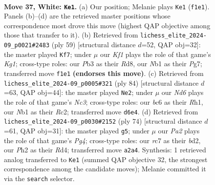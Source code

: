 \documentclass[11pt]{article}
\begin{document}
\clearpage

\begin{figure}[p]\centering
\begin{subfigure}{0.46\textwidth}\centering
\resizebox{\linewidth}{!}{%
\newchessgame
\chessboard[
  setfen={6k1/2r2ppp/rnbN4/p3p1P1/8/1P2P1R1/P5PP/RN3K2 w - - 2 37},
  showmover=false,
  pgfstyle=straightmove, color=movearrow, markmove={f1-e1}
]}
\caption{}
\end{subfigure}\hfill
\begin{subfigure}{0.46\textwidth}\centering
\resizebox{\linewidth}{!}{%
\newchessgame
\chessboard[
  setfen={3r2k1/1pr3pp/8/pP6/Pn1p1PP1/3P4/1B3R1P/3R2K1 b - - 0 30},
  showmover=false,
  pgfstyle=straightmove, color=movearrow, markmove={g8-f7}
]}
\caption{}
\end{subfigure}
\\[4pt]
\begin{subfigure}{0.46\textwidth}\centering
\resizebox{\linewidth}{!}{%
\newchessgame
\chessboard[
  setfen={1r3b2/r4pk1/2p5/3p4/p2P1PB1/1nN3P1/1PR2PK1/7R w - - 12 43},
  showmover=false,
  pgfstyle=straightmove, color=movearrow, markmove={c3-e2}
]}
\caption{}
\end{subfigure}\hfill
\begin{subfigure}{0.46\textwidth}\centering
\resizebox{\linewidth}{!}{%
\newchessgame
\chessboard[
  setfen={8/3r1kpp/R2p1p2/1p1N1P2/3RP1PP/3P4/1r1b4/7K w - - 1 38},
  showmover=false,
  pgfstyle=straightmove, color=movearrow, markmove={g4-g5}
]}
\caption{}
\end{subfigure}
\caption{\textbf{Move 37, White: \texttt{Ke1}.} (a) Our position; Melanie plays \texttt{Ke1} (\texttt{f1e1}). Panels (b)--(d) are the retrieved master positions whose correspondence most drove this move (highest QAP objective among those that transfer to it). (b) Retrieved from \texttt{lichess\_elite\_2024-09\_p0021\#2483} (ply 59) [structural distance $d$=52, QAP obj=32]: the master played \texttt{Kf7}; under $\mu$ our \emph{Kf1} plays the role of that game's \emph{Kg1}; cross-type roles: our \emph{P}b3 as their \emph{R}d8, our \emph{N}b1 as their \emph{P}g7; transferred move \texttt{f1e1} \textbf{(endorses this move)}. (c) Retrieved from \texttt{lichess\_elite\_2024-09\_p0005\#321} (ply 84) [structural distance $d$=63, QAP obj=44]: the master played \texttt{Ne2}; under $\mu$ our \emph{Nd6} plays the role of that game's \emph{Nc3}; cross-type roles: our \emph{b}c6 as their \emph{R}h1, our \emph{N}b1 as their \emph{R}c2; transferred move \texttt{d6e4}. (d) Retrieved from \texttt{lichess\_elite\_2024-09\_p0030\#2152} (ply 74) [structural distance $d$=61, QAP obj=31]: the master played \texttt{g5}; under $\mu$ our \emph{Pa2} plays the role of that game's \emph{Pg4}; cross-type roles: our \emph{r}c7 as their \emph{b}d2, our \emph{P}h2 as their \emph{R}d4; transferred move \texttt{a2a4}. Synthesis: 1 retrieved analog transferred to \texttt{Ke1} (summed QAP objective 32, the strongest correspondence among the candidate moves); Melanie committed it via the \texttt{search} selector.}
\label{fig:thought-m72}
\end{figure}
\end{document}
